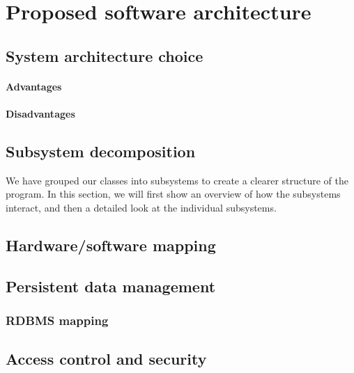 \chapter{Proposed software architecture}
\label{sec:Proposed software architecture}






\section{System architecture choice}


\subsubsection{Advantages}

\subsubsection{Disadvantages}

\section{Subsystem decomposition}
We have grouped our classes into subsystems to create a clearer structure of the program. In this section, we will first show an overview of how the subsystems interact, and then a detailed look at the individual subsystems.




\section{Hardware/software mapping}

\section{Persistent data management}

\subsection{RDBMS mapping}

\section{Access control and security}

